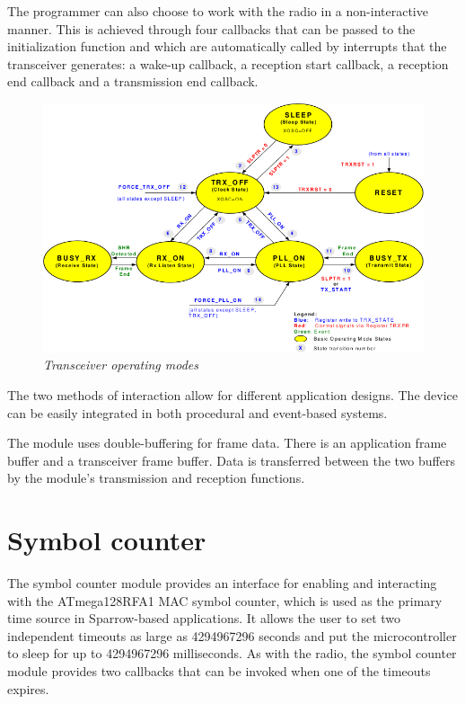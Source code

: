 The programmer can also choose to work with the radio in a non-interactive
manner. This is achieved through four callbacks that can be passed to the
initialization function and which are automatically called by interrupts that the
transceiver generates: a wake-up callback, a reception start callback, a
reception end callback and a transmission end callback.


\begin{figure}[ht]
	\begin{center}
		\includegraphics[width=\textwidth]
		{img/transceiver_operating_modes.png}
	\end{center}
	\caption{\small \itshape{Transceiver operating
	modes\protect\footnotemark}}
\end{figure}

The two methods of interaction allow for different application designs.
The device can be easily integrated in both procedural and event-based systems.

The module uses double-buffering for frame data. There is an application frame
buffer and a transceiver frame buffer. Data is transferred between the two
buffers by the module's transmission and reception functions.

\section{Symbol counter}

The symbol counter module provides an interface for enabling and interacting
with the ATmega128RFA1 MAC symbol counter, which is used as the primary time
source in Sparrow-based applications. It allows the user to set two independent
timeouts as large as 4294967296 seconds and put the microcontroller to sleep
for up to 4294967296 milliseconds. As with the radio, the symbol counter module
provides two callbacks that can be invoked when one of the timeouts expires.


